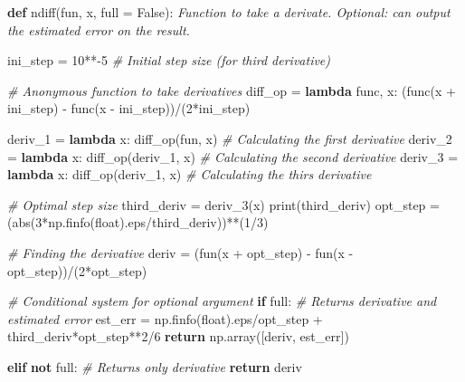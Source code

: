 \documentclass[
]{article}
\newenvironment{Shaded}{}{}
\newcommand{\BuiltInTok}[1]{#1}
\newcommand{\CommentTok}[1]{\textcolor[rgb]{0.38,0.63,0.69}{\textit{#1}}}
\newcommand{\ControlFlowTok}[1]{\textcolor[rgb]{0.00,0.44,0.13}{\textbf{#1}}}
\newcommand{\DecValTok}[1]{\textcolor[rgb]{0.25,0.63,0.44}{#1}}
\newcommand{\KeywordTok}[1]{\textcolor[rgb]{0.00,0.44,0.13}{\textbf{#1}}}
\newcommand{\NormalTok}[1]{#1}
\newcommand{\OperatorTok}[1]{\textcolor[rgb]{0.40,0.40,0.40}{#1}}
\newcommand{\VariableTok}[1]{\textcolor[rgb]{0.10,0.09,0.49}{#1}}
\begin{document}
\begin{Shaded}
\begin{Highlighting}[]

\KeywordTok{def}\NormalTok{ ndiff(fun, x, full }\OperatorTok{=} \VariableTok{False}\NormalTok{):}
    \CommentTok{\textquotesingle{}\textquotesingle{}\textquotesingle{}Function to take a derivate. Optional: can output the estimated error on the result.\textquotesingle{}\textquotesingle{}\textquotesingle{}}
    
\NormalTok{    ini\_step }\OperatorTok{=} \DecValTok{10}\OperatorTok{**{-}}\DecValTok{5} \CommentTok{\# Initial step size (for third derivative)}
    
    \CommentTok{\# Anonymous function to take derivatives}
\NormalTok{    diff\_op }\OperatorTok{=} \KeywordTok{lambda}\NormalTok{ func, x: (func(x }\OperatorTok{+}\NormalTok{ ini\_step) }\OperatorTok{{-}}\NormalTok{ func(x }\OperatorTok{{-}}\NormalTok{ ini\_step))}\OperatorTok{/}\NormalTok{(}\DecValTok{2}\OperatorTok{*}\NormalTok{ini\_step)}

\NormalTok{    deriv\_1 }\OperatorTok{=} \KeywordTok{lambda}\NormalTok{ x: diff\_op(fun, x)     }\CommentTok{\# Calculating the first derivative}
\NormalTok{    deriv\_2 }\OperatorTok{=} \KeywordTok{lambda}\NormalTok{ x: diff\_op(deriv\_1, x) }\CommentTok{\# Calculating the second derivative}
\NormalTok{    deriv\_3 }\OperatorTok{=} \KeywordTok{lambda}\NormalTok{ x: diff\_op(deriv\_1, x) }\CommentTok{\# Calculating the thirs derivative}
    
    \CommentTok{\# Optimal step size}
\NormalTok{    third\_deriv }\OperatorTok{=}\NormalTok{ deriv\_3(x)}
    \BuiltInTok{print}\NormalTok{(third\_deriv)}
\NormalTok{    opt\_step }\OperatorTok{=}\NormalTok{ (}\BuiltInTok{abs}\NormalTok{(}\DecValTok{3}\OperatorTok{*}\NormalTok{np.finfo(}\BuiltInTok{float}\NormalTok{).eps}\OperatorTok{/}\NormalTok{third\_deriv))}\OperatorTok{**}\NormalTok{(}\DecValTok{1}\OperatorTok{/}\DecValTok{3}\NormalTok{)}
    
    \CommentTok{\# Finding the derivative}
\NormalTok{    deriv }\OperatorTok{=}\NormalTok{ (fun(x }\OperatorTok{+}\NormalTok{ opt\_step) }\OperatorTok{{-}}\NormalTok{ fun(x }\OperatorTok{{-}}\NormalTok{ opt\_step))}\OperatorTok{/}\NormalTok{(}\DecValTok{2}\OperatorTok{*}\NormalTok{opt\_step)}

    \CommentTok{\# Conditional system for optional argument}
    \ControlFlowTok{if}\NormalTok{ full:}
        \CommentTok{\# Returns derivative and estimated error}
\NormalTok{        est\_err }\OperatorTok{=}\NormalTok{ np.finfo(}\BuiltInTok{float}\NormalTok{).eps}\OperatorTok{/}\NormalTok{opt\_step }\OperatorTok{+}\NormalTok{ third\_deriv}\OperatorTok{*}\NormalTok{opt\_step}\OperatorTok{**}\DecValTok{2}\OperatorTok{/}\DecValTok{6}
        \ControlFlowTok{return}\NormalTok{ np.array([deriv, est\_err])}
    
    \ControlFlowTok{elif} \KeywordTok{not}\NormalTok{ full:}
        \CommentTok{\# Returns only derivative}
        \ControlFlowTok{return}\NormalTok{ deriv}
\end{Highlighting}
\end{Shaded}
\end{document}
